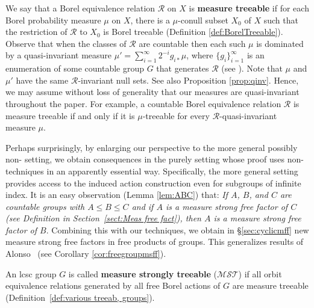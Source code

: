 \documentclass[11pt]{amsart}
\theoremstyle{definition}
\theoremstyle{plain}
\newcommand{\<}{\langle}
\renewcommand{\>}{\rangle}
\newcommand{\MSTreeable}{\bm{\mathscr{MST}}}
\newcommand{\define}[1]{\textbf{#1}}
\newcommand{\pmp}{\text{p.m.p.}}
\newcommand\RR{\mathscr{R}}
\begin{document}
We say that a Borel equivalence relation $\RR$ on $X$ is \define{measure
treeable} if for each Borel probability measure $\mu$ on $X$, there is a
$\mu$-conull subset $X_0$ of $X$ such that the restriction of $\RR$ to $X_0$ is
Borel treeable (Definition \ref{def:BorelTreeable}). Observe that when the
classes of $\RR$ are countable then each such $\mu$ is dominated by a
quasi-invariant measure $\mu ' = \sum_{i=1}^{\infty} 2^{-i} g_{i*}\mu$, where
$\{g_i\}_{i=1}^{\infty}$ is an enumeration of some countable group $G$ that
generates $\RR$ (see \cite{FM77}). Note that $\mu$ and $\mu '$ have the same
$\RR$-invariant null sets. See also Proposition \ref{prop:qinv}. Hence, we may assume without loss of generality
that our measures are quasi-invariant throughout the paper. For example, a
countable Borel equivalence relation
$\RR$ is measure treeable if and only if it is $\mu$-treeable for
every $\RR$-quasi-invariant measure $\mu$.


Perhaps surprisingly, by enlarging our perspective to the more general possibly non-\pmp{} setting, we obtain consequences in the purely \pmp setting whose proof uses non-\pmp{} techniques in an apparently essential way. Specifically, the more general setting provides access to the induced action construction even for subgroups of infinite index.
It is an easy observation (Lemma \ref{lem:ABC}) that: {\em If $A$, $B$, and $C$ are countable groups with $A\leq B\leq C$ and if $A$ is a measure strong free factor of $C$ (see Definition in Section~\ref{sect:Meas free fact}), then $A$ is a measure strong free factor of $B$}. Combining this with our techniques, we obtain in \S\ref{sec:cyclicmff} new measure strong free factors in free products of groups. This generalizes results of Alonso~\cite{Alonso-2014} (see Corollary \ref{cor:freegroupmsff}).

\medskip
An lcsc group $G$ is called \define{measure strongly treeable} (${\MSTreeable}$) if all orbit equivalence relations generated by all free Borel actions of $G$ are measure treeable (Definition~\ref{def:various treeab, groups}).
\end{document}
